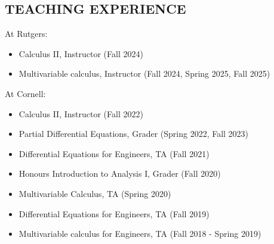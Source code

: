 \documentclass[margin]{res} %
\begin{document}
\begin{resume}
\section{TEACHING EXPERIENCE}
At Rutgers:
\begin{itemize}
	\item Calculus II, Instructor (Fall 2024)
	\item Multivariable calculus, Instructor (Fall 2024, Spring 2025, Fall 2025)
\end{itemize}

At Cornell:
\begin{itemize}
	\item Calculus II, Instructor (Fall 2022)
	\item Partial Differential Equations, Grader (Spring 2022, Fall 2023)
	\item Differential Equations for Engineers, TA (Fall 2021)
	\item Honours Introduction to Analysis I, Grader (Fall 2020)
	\item Multivariable Calculus, TA (Spring 2020)
	\item Differential Equations for Engineers, TA (Fall 2019)
	\item Multivariable calculus for Engineers, TA (Fall 2018 - Spring 2019)
\end{itemize}


\end{resume}
\end{document}
